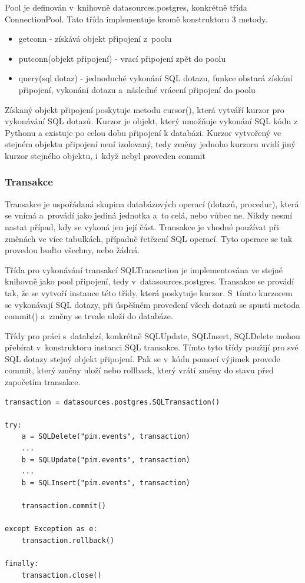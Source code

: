 \documentclass[bc,male,html,dept460]{diploma}				%
\begin{document}
Pool je definován v~knihovně datasources.postgres, konkrétně třída ConnectionPool. Tato třída implementuje kromě konstruktoru 3 metody. 
\begin{itemize}
 \item getconn - získává objekt připojení z~poolu
 \item putconn(objekt připojení) - vrací připojení zpět do poolu 
 \item query(sql dotaz) - jednoduché vykonání SQL dotazu, funkce obstará získání připojení, vykonání dotazu a~následné vrácení připojení do poolu
\end{itemize}

Získaný objekt připojení poskytuje metodu cursor(), která vytváří kurzor pro vykonávání SQL dotazů.
Kurzor je objekt, který umožňuje vykonání SQL kódu z Pythonu a existuje po celou dobu připojení k databázi.
Kurzor vytvořený ve stejném objektu připojení není izolovaný, tedy změny jednoho kurzoru uvidí jiný kurzor stejného objektu, i~když nebyl proveden commit


\subsubsection{Transakce}
Transakce je uspořádaná skupina databázových operací (dotazů, procedur), která se vnímá a~provádí jako jediná jednotka a~to celá, nebo vůbec ne. Nikdy nesmí nastat případ, kdy se vykoná jen její část. Transakce je vhodné používat při změnách ve více tabulkách, případně řetězení SQL operací. Tyto operace se tak provedou buďto všechny, nebo žádná.

Třída pro vykonávání transakcí SQLTransaction je implementována ve stejné knihovně jako pool připojení, tedy v~datasources.postgres.
Transakce se provádí tak, že se vytvoří instance této třídy, která poskytuje kurzor. S~tímto kurzorem se vykonávají SQL dotazy, při úspěšném provedení všech dotazů se spustí metoda commit() a~změny se trvale uloží do databáze.

Třídy pro práci s~databází, konkrétně SQLUpdate, SQLInsert, SQLDelete mohou přebírat v~konstruktoru instanci SQL transakce.
Tímto tyto třídy použijí pro své SQL dotazy stejný objekt připojení. Pak se v~kódu pomocí výjimek provede commit, který změny uloží nebo rollback, který vrátí změny do stavu před započetím transakce.


\begin{lstlisting}[label=src:Python,caption=Ukázka použití transakcí]
transaction = datasources.postgres.SQLTransaction()

try:
	a = SQLDelete("pim.events", transaction)
	...
	b = SQLUpdate("pim.events", transaction)
	...
	b = SQLInsert("pim.events", transaction)
	
	transaction.commit()
	
except Exception as e:
	transaction.rollback()
	
finally:
	transaction.close()

\end{lstlisting}
\newpage
\end{document}

